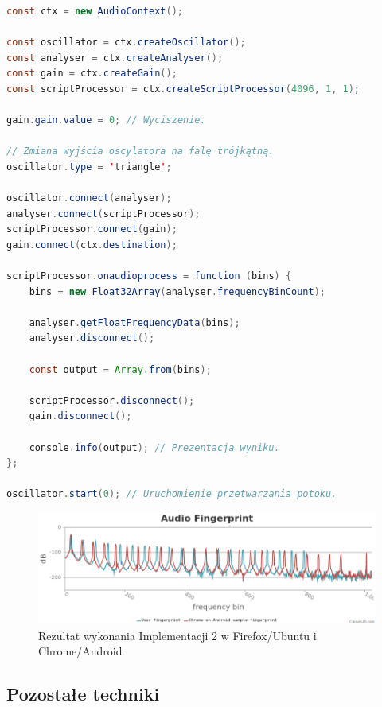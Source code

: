 \begin{lstlisting}[float,language=Java,caption=Podstawowy Web Audio fingerprinting w JavaScript]
const ctx = new AudioContext();

const oscillator = ctx.createOscillator();
const analyser = ctx.createAnalyser();
const gain = ctx.createGain();
const scriptProcessor = ctx.createScriptProcessor(4096, 1, 1);

gain.gain.value = 0; // Wyciszenie.

// Zmiana wyjścia oscylatora na falę trójkątną.
oscillator.type = 'triangle';

oscillator.connect(analyser);
analyser.connect(scriptProcessor);
scriptProcessor.connect(gain);
gain.connect(ctx.destination);

scriptProcessor.onaudioprocess = function (bins) {
    bins = new Float32Array(analyser.frequencyBinCount);

    analyser.getFloatFrequencyData(bins);
    analyser.disconnect();

    const output = Array.from(bins);

    scriptProcessor.disconnect();
    gain.disconnect();

    console.info(output); // Prezentacja wyniku.
};

oscillator.start(0); // Uruchomienie przetwarzania potoku.
\end{lstlisting}

\begin{figure}
	\includegraphics[width=\textwidth,keepaspectratio]{img/08}
	\caption{Rezultat wykonania Implementacji 2 w Firefox/Ubuntu i Chrome/Android}
\end{figure}

\subsection{Pozostałe techniki}


